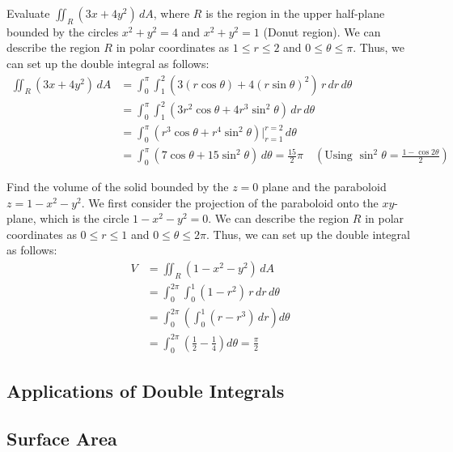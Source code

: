 \documentclass[11pt]{report}
\begin{document}
\begin{example}
    Evaluate $\iint_R (3x + 4y^2) \, dA$, where $R$ is the region in the upper half-plane bounded by the circles $x^2 + y^2 = 4$ and $x^2 + y^2 = 1$ (Donut region).
    We can describe the region $R$ in polar coordinates as $1 \le r \le 2$ and $0 \le \theta \le \pi$. Thus, we can set up the double integral as follows:
    \begin{align*}
        \iint_R (3x + 4y^2) \, dA &= \int_0^\pi \int_1^2 (3(r \cos{\theta}) + 4(r \sin{\theta})^2) \, r \, dr \, d\theta \\
        &= \int_0^\pi \int_1^2 (3r^2 \cos{\theta} + 4r^3 \sin^2{\theta}) \, dr \, d\theta \\
        &= \int_0^\pi (r^3\cos \theta + r^4 \sin^2 \theta) \Big|_{r=1}^{r=2} \, d\theta \\
        &= \int_0^\pi (7\cos \theta + 15 \sin^2 \theta) \, d\theta = \frac{15}{2} \pi \quad \left(\text{Using } \sin^2 \theta = \frac{1 - \cos 2\theta}{2}\right)
    \end{align*}
\end{example}

\begin{example}
    Find the volume of the solid bounded by the $z=0$ plane and the paraboloid $z = 1 - x^2 - y^2$. We first consider the projection of the paraboloid onto the $xy$-plane, which is the circle $1 - x^2 - y^2 = 0$. We can describe the region $R$ in polar coordinates as $0 \le r \le 1$ and $0 \le \theta \le 2\pi$. Thus, we can set up the double integral as follows:
    \begin{align*}
        V &= \iint_R (1 - x^2 - y^2) \, dA \\
        &= \int_0^{2\pi} \int_0^1 (1 - r^2) \, r \, dr \, d\theta \\
        &= \int_0^{2\pi} \left( \int_0^1 (r - r^3) \, dr \right) d\theta \\
        &= \int_0^{2\pi} \left( \frac{1}{2} - \frac{1}{4} \right) d\theta  = \frac{\pi}{2}
    \end{align*}
\end{example}

\subsection{Applications of Double Integrals}
\subsection{Surface Area}
\end{document}

